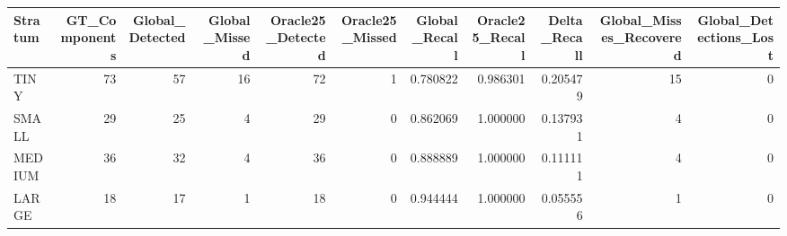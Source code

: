 \begin{tabular}{lrrrrrrrrrr}
\toprule
Stratum & GT_Components & Global_Detected & Global_Missed & Oracle25_Detected & Oracle25_Missed & Global_Recall & Oracle25_Recall & Delta_Recall & Global_Misses_Recovered & Global_Detections_Lost \\
\midrule
TINY & 73 & 57 & 16 & 72 & 1 & 0.780822 & 0.986301 & 0.205479 & 15 & 0 \\
SMALL & 29 & 25 & 4 & 29 & 0 & 0.862069 & 1.000000 & 0.137931 & 4 & 0 \\
MEDIUM & 36 & 32 & 4 & 36 & 0 & 0.888889 & 1.000000 & 0.111111 & 4 & 0 \\
LARGE & 18 & 17 & 1 & 18 & 0 & 0.944444 & 1.000000 & 0.055556 & 1 & 0 \\
\bottomrule
\end{tabular}

